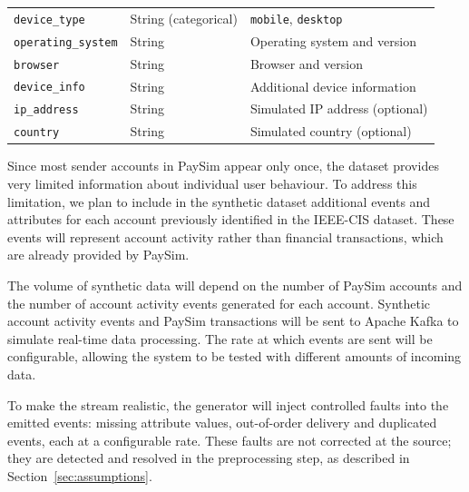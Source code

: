 \documentclass[titlepage]{article}
\begin{document}
\begin{table}[H]
\begin{tabularx}{\textwidth}{@{}l l X@{}}
        \texttt{device\_type} & String (categorical) & \texttt{mobile}, \texttt{desktop} \\

        \addlinespace

        \texttt{operating\_system} & String & Operating system and version \\

        \addlinespace

        \texttt{browser} & String & Browser and version \\

        \addlinespace

        \texttt{device\_info} & String & Additional device information \\

        \addlinespace

        \texttt{ip\_address} & String & Simulated IP address (optional) \\

        \addlinespace

        \texttt{country} & String & Simulated country (optional) \\

        \bottomrule
    \end{tabularx}
\end{table}

Since most sender accounts in PaySim appear only once, the dataset provides very limited information about individual user behaviour. To address this limitation, we plan to include in the synthetic dataset additional events and attributes for each account previously identified in the IEEE-CIS dataset. These events will represent account activity rather than financial transactions, which are already provided by PaySim.

The volume of synthetic data will depend on the number of PaySim accounts and the number of account activity events generated for each account. Synthetic account activity events and PaySim transactions will be sent to Apache Kafka to simulate real-time data processing. The rate at which events are sent will be configurable, allowing the system to be tested with different amounts of incoming data.

To make the stream realistic, the generator will inject controlled faults into the emitted events: missing attribute values, out-of-order delivery and duplicated events, each at a configurable rate. These faults are not corrected at the source; they are detected and resolved in the preprocessing step, as described in Section~\ref{sec:assumptions}.
\end{document}
